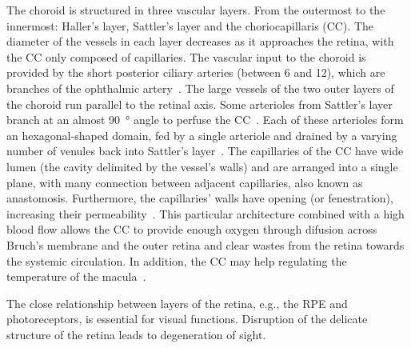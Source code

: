 \documentclass[12pt,a4paper]{journal}
\begin{document}
%
The choroid is structured in three vascular layers.
From the outermost to the innermost: Haller's layer, Sattler's layer and the choriocapillaris (CC).
The diameter of the vessels in each layer decreases as it approaches the retina, with the CC only composed of capillaries.
The vascular input to the choroid is provided by the short posterior ciliary arteries (between 6 and 12), which are branches of the ophthalmic artery~\cite{Kiel2010}.
The large vessels of the two outer layers of the choroid run parallel to the retinal axis.
Some arterioles from Sattler's layer branch at an almost \SI{90}{\degree} angle to perfuse the CC~\cite{Nickla2010}.
Each of these arterioles form an hexagonal-shaped domain, fed by a single arteriole and drained by a varying number of venules back into Sattler's layer~\cite{Zouache2016}.
The capillaries of the CC have wide lumen (the cavity delimited by the vessel's walls) and are arranged into a single plane, with many connection between adjacent capillaries, also known as anastomosis.
Furthermore, the capillaries' walls have opening (or fenestration), increasing their permeability~\cite{Torczynski1976}.
This particular architecture combined with a high blood flow allows the CC to provide enough oxygen through difusion across Bruch's membrane and the outer retina and clear wastes from the retina towards the systemic circulation.
In addition, the CC may help regulating the temperature of the macula~\cite{Parver1991}.

The close relationship between layers of the retina, e.g., the RPE and photoreceptors, is essential for visual functions.
Disruption of the delicate structure of the retina leads to degeneration of sight.
\end{document}
